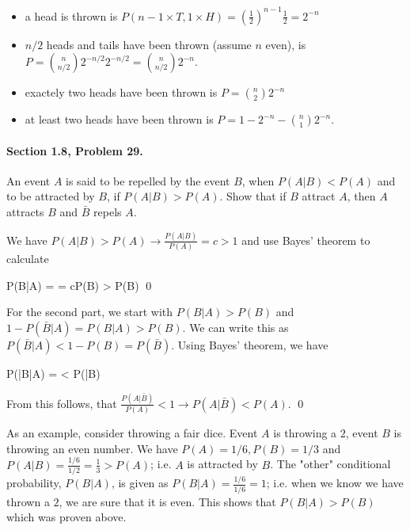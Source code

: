 \begin{itemize}

\item a head is thrown is $P( n-1 \times T, 1 \times H) = \left(\frac{1}{2}\right)^{n-1} \frac{1}{2} = 2^{-n}$

\item $n/2$ heads and tails have been thrown (assume $n$ even), is $P = {n \choose n/2} 2^{-n/2} 2^{-n/2} = {n \choose n/2}2^{-n}$.

\item exactely two heads have been thrown is $P = {n \choose 2} 2^{-n}$

\item at least two heads have been thrown is $P = 1 - 2^{-n} - {n \choose 1} 2^{-n}$.
  
\end{itemize}


\paragraph{Section 1.8, Problem 29.} An event $A$ is said to be repelled by the event $B$, when $P(A|B) < P(A)$ and to be attracted by $B$, if $P(A|B) > P(A)$. Show that if $B$ attract $A$, then $A$ attracts $B$ and $\bar{B}$ repels $A$.

We have $P(A|B) > P(A) \rightarrow \frac{P(A|B)}{P(A)} = c > 1$ and use Bayes' theorem to calculate

\bee
P(B|A) =  = cP(B) > P(B) \qed
\eee

For the second part, we start with $P(B|A)>P(B)$ and $1 - P(\bar{B}|A) = P(B|A) > P(B)$. We can write this as $P(\bar{B}|A) < 1-P(B) = P(\bar{B})$. Using Bayes' theorem, we have

\bee
P(\bar{B}|A) =  < P(\bar{B})
\eee

From this follows, that $\frac{P(A|\bar{B})}{P(A)} < 1 \rightarrow P(A|\bar{B}) < P(A)$. \qed

As an example, consider throwing a fair dice. Event $A$ is throwing a $2$, event $B$ is throwing an even number. We have $P(A) = 1/6, P(B) = 1/3$ and $P(A|B) = \frac{1/6}{1/2} = \frac{1}{3} > P(A)$; i.e. $A$ is attracted by $B$. The "other" conditional probability, $P(B|A)$, is given as $P(B|A) = \frac{1/6}{1/6} = 1$; i.e. when we know we have thrown a $2$, we are sure that it is even. This shows that $P(B|A) > P(B)$ which was proven above.

